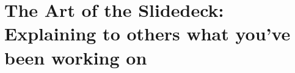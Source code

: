 \chapter[Presentation Preparations]{The Art of the Slidedeck: Explaining to others what you've been working on}

